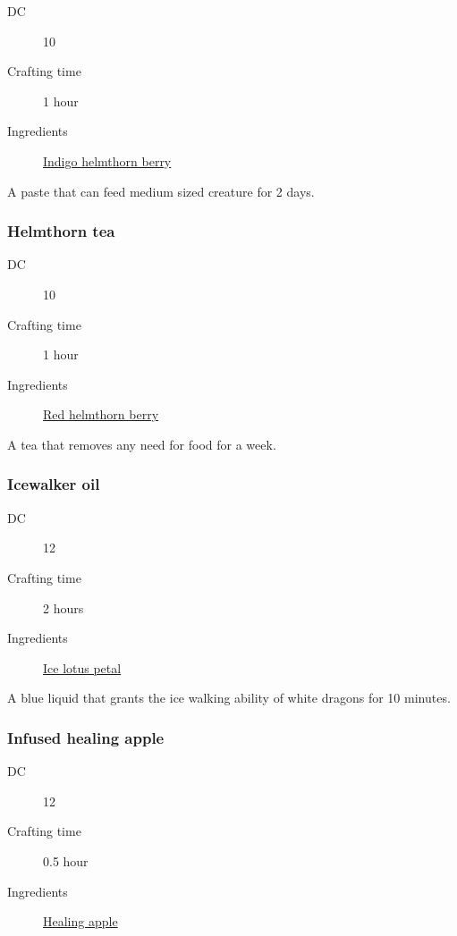 \begin{description}
\item [DC] 10 \survival
\item [Crafting time] 1 hour
\item [Ingredients] \hyperref[Helmthorn]{Indigo helmthorn berry}
\end{description}

A paste that can feed medium sized creature for 2 days.

\subsubsection{Helmthorn tea}
\label{Helmthorn tea}

\begin{description}
\item [DC] 10 \survival
\item [Crafting time] 1 hour
\item [Ingredients] \hyperref[Helmthorn]{Red helmthorn berry}
\end{description}

A tea that removes any need for food for a week.

\subsubsection{Icewalker oil}
\label{Icewalker oil}

\begin{description}
\item [DC] 12 \survival
\item [Crafting time] 2 hours
\item [Ingredients] \hyperref[Ice Lotus]{Ice lotus petal}
\end{description}

A blue liquid that grants the ice walking ability of white dragons for 10 minutes.

\subsubsection{Infused healing apple}
\label{Infused healing apple}

\begin{description}
\item [DC] 12 \medicine
\item [Crafting time] 0.5 hour
\item [Ingredients] \hyperref[Healing Apple Tree]{Healing apple}
\end{description}

